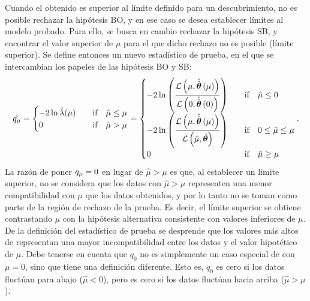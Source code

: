 Cuando el \pval obtenido es superior al límite definido para un descubrimiento, no es posible rechazar la hipótesis \ac{BO}, y en ese caso se desea establecer límites al modelo probado. Para ello, se busca en cambio rechazar la hipótesis \ac{SB}, y encontrar el valor superior de \(\mu\) para el que dicho rechazo no es posible (límite superior). Se define entonces un nuevo estadístico de prueba, en el que se intercambian los papeles de las hipótesis \ac{BO} y \ac{SB}:
\begin{equation}
    \tilde{\qmu} =
    \begin{cases}
        -2 \ln \tilde{\lambda}(\mu) & \qif \hat{\mu} \leq \mu\\
        0                           & \qif \hat{\mu} > \mu
    \end{cases}
    =
    \begin{cases}
        \displaystyle -2 \ln \left(\frac{
            \mathcal{L} \left(\mu, \hat{\hat{\bm{\theta}}} \left(\mu\right)\right)
        }{
            \mathcal{L} \left(0, \hat{\hat{\bm{\theta}}} \left(0\right)\right)
        }\right) & \qif \hat{\mu} \leq 0\\
        \displaystyle -2 \ln \left(\frac{
            \mathcal{L} \left(\mu, \hat{\hat{\bm{\theta}}} \left(\mu\right)\right)
        }{
            \mathcal{L} \left(\hat{\mu}, \hat{\bm{\theta}}\right)
        }\right) & \qif 0 \leq \hat{\mu} \leq \mu\\
        0 & \qif \hat{\mu} \geq \mu\\
    \end{cases}.
\end{equation}
La razón de poner \(q_{\mu} = 0\) en lugar de \(\hat{\mu} > \mu\) es que, al establecer un límite superior, no se considera que los datos con \(\hat{\mu} > \mu\) representen una menor compatibilidad con \(\mu\) que los datos obtenidos, y por lo tanto no se toman como parte de la región de rechazo de la prueba. Es decir, el límite superior se obtiene contrastando \(\mu\) con la hipótesis alternativa consistente con valores inferiores de \(\mu\). De la definición del estadístico de prueba se desprende que los valores más altos de \qmu representan una mayor incompatibilidad entre los datos y el valor hipotético de \(\mu\). Debe tenerse en cuenta que \(q_0\) no es simplemente un caso especial de \qmu con \(\mu = 0\), sino que tiene una definición diferente. Esto es, \(q_0\) es cero si los datos fluctúan para abajo (\(\hat{\mu} < 0\)), pero \qmu es cero si los datos fluctúan hacia arriba (\(\hat{\mu} > \mu\)).


